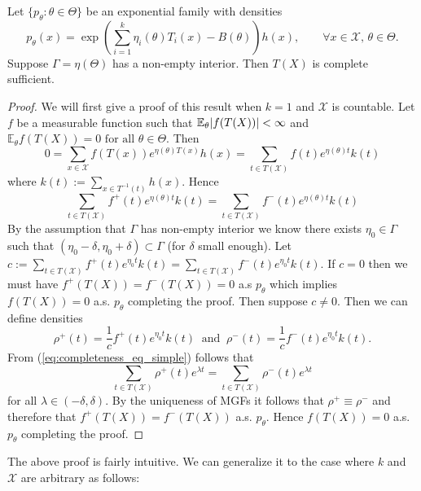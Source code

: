 \begin{theorem}
	Let $\{p_\theta : \theta \in \Theta \}$ be an exponential family with densities \[
	p_\theta(x) = \exp\left(\sum_{i=1}^k \eta_i(\theta)T_i(x) - B(\theta) \right) h(x), \qquad \forall x \in \mathcal X, \, \theta \in \Theta.
	\] Suppose $\Gamma = \eta(\Theta)$ has a non-empty interior. Then $T(X)$ is complete sufficient.
\end{theorem}

\begin{proof}
	We will first give a proof of this result when $k = 1$ and $\mathcal{X}$ is countable. 	Let $f$ be a measurable function such that $\mathbb{E}_\theta|f(T(X))| < \infty$ and \(
	\mathbb E_\theta f(T(X)) = 0 \text{ for all } \theta \in \Theta.
	\) Then \[
		0 = \sum_{x \in \mathcal X} f(T(x)) e^{\eta(\theta) T(x)} h(x) = \sum_{t \in T(\mathcal X)} f(t) e^{\eta(\theta) t} k(t)
	\] where $k(t) := \sum_{x \in T^{-1}(t)} h(x)$. Hence \begin{equation}
		\sum_{t \in T(\mathcal X)} f^+(t) e^{\eta(\theta) t} k(t) = \sum_{t \in T(\mathcal X)} f^-(t) e^{\eta(\theta) t} k(t)
		\label{eq:completeness_eq_simple}
	\end{equation} By the assumption that $\Gamma$ has non-empty interior we know there exists $\eta_0 \in \Gamma$ such that $(\eta_0 - \delta, \eta_0 + \delta) \subset \Gamma$ (for $\delta$ small enough). Let $c := \sum_{t \in T(\mathcal X)} f^+(t) e^{\eta_0 t} k(t) = \sum_{t \in T(\mathcal X)} f^-(t) e^{\eta_0t} k(t)$. If $c = 0$ then we must have $f^+(T(X)) = f^-(T(X)) = 0$ a.s $p_\theta$ which implies $f(T(X)) =  0$ a.s. $p_\theta$ completing the proof. Then suppose $c \neq 0$.  Then we can define densities \[
		\rho^+(t) = \frac{1}{c} f^+(t) e^{\eta_0 t} k(t) \ \text{ and } \ \rho^-(t) = \frac{1}{c} f^-(t) e^{\eta_0 t} k(t).
	\] From (\ref{eq:completeness_eq_simple}) follows that \[
			\sum_{t \in T(\mathcal X)} \rho^+(t) e^{\lambda t} = \sum_{t \in T(\mathcal X)} \rho^-(t) e^{\lambda t}
	\] for all $\lambda \in (-\delta, \delta)$. By the uniqueness of MGFs it follows that $\rho^+ \equiv \rho^-$ and therefore that $f^+(T(X)) = f^-(T(X))$ a.s. $p_\theta$. Hence $f(T(X)) =  0$ a.s. $p_\theta$ completing the proof.
\end{proof}

\noindent The above proof is fairly intuitive. We can generalize it to the case where $k$ and $\mathcal X$ are arbitrary as follows:

